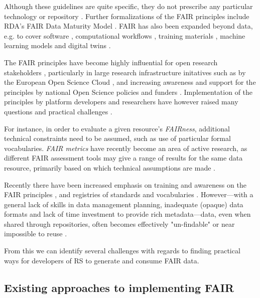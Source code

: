 Although these guidelines are quite specific, they do not prescribe any particular technology or repository \cite{Mons 2017}. Further formalizations of the FAIR principles include RDA's FAIR Data Maturity Model \cite{FAIR Maturity 2020,Bahui 2020}. FAIR has also been expanded beyond data, e.g. to cover software \cite{Katz 2021b}, computational workflows \cite{Goble 2020}, training materials \cite{Garcia 2020a}, machine learning models \cite{Duarte 2023} and digital twins \cite{Schultes 2022}. 

The FAIR principles have become highly influential for open research stakeholders \cite{Jacobsen 2020}, particularly in large research infrastructure initatives such as by the European Open Science Cloud  \cite{Schouppe 2018}, and increasing awareness and support for the principles by national Open Science policies and funders \cite{Davidson 2019,Davidson 2022}.
Implementation of the principles by platform developers and researchers have however raised many questions and practical challenges \cite{Mons 2020,Riungu-Kalliosaari 2022}. 

For instance, in order to evaluate a given resource's \emph{FAIRness}, additional technical constraints need to be assumed, such as use of particular formal vocabularies. \emph{FAIR metrics} \cite{Wilkinson 2018,Devaraju 2021} have recently become an area of active research, as different FAIR assessment tools may give a range of results for the same data resource, primarily based on which technical assumptions are made \cite{Wilkinson 2022a,Verburg 2023}.

Recently there have been increased emphasis on training and awareness on the FAIR principles \cite{Shanahan 2021,Rocca-Serra 2023}, and registries of standards and vocabularies \cite{Sansone 2019}.
However---with a general lack of skills in data management planning, inadequate (opaque) data formats and lack of time investment to provide rich metadata---data, even when shared through repositories, often becomes effectively "un-findable" or near impossible to reuse \cite{Carballo-Garcia 2022}.

From this we can identify several challenges with regards to finding practical ways for developers of \acrlong{RS} to generate and consume FAIR data.



\subsection{Existing approaches to implementing FAIR}

